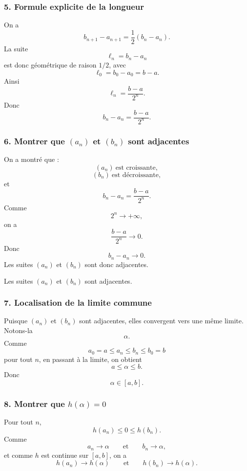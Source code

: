 \documentclass[11pt,a4paper]{article}
\begin{document}
\subsubsection*{5. Formule explicite de la longueur}

On a
\[
b_{n+1}-a_{n+1}=\frac12(b_n-a_n).
\]
La suite
\[
\ell_n=b_n-a_n
\]
est donc géométrique de raison \(1/2\), avec
\[
\ell_0=b_0-a_0=b-a.
\]
Ainsi
\[
\ell_n=\frac{b-a}{2^n}.
\]
Donc
\[
b_n-a_n=\frac{b-a}{2^n}.
\]


\subsubsection*{6. Montrer que \((a_n)\) et \((b_n)\) sont adjacentes}

On a montré que :
\[
(a_n)\ \text{est croissante},
\]
\[
(b_n)\ \text{est décroissante},
\]
et
\[
b_n-a_n=\frac{b-a}{2^n}.
\]
Comme
\[
2^n\to+\infty,
\]
on a
\[
\frac{b-a}{2^n}\to0.
\]
Donc
\[
b_n-a_n\to0.
\]
Les suites \((a_n)\) et \((b_n)\) sont donc adjacentes.

\begin{resultatbox}
Les suites \((a_n)\) et \((b_n)\) sont adjacentes.
\end{resultatbox}


\subsubsection*{7. Localisation de la limite commune}

Puisque \((a_n)\) et \((b_n)\) sont adjacentes, elles convergent vers une même limite. Notons-la
\[
\alpha.
\]
Comme
\[
a_0=a\leq a_n\leq b_n\leq b_0=b
\]
pour tout \(n\), en passant à la limite, on obtient
\[
a\leq\alpha\leq b.
\]
Donc
\[
\alpha\in[a,b].
\]


\subsubsection*{8. Montrer que \(h(\alpha)=0\)}

Pour tout \(n\),
\[
h(a_n)\leq0\leq h(b_n).
\]
Comme
\[
a_n\to\alpha
\qquad\text{et}\qquad
b_n\to\alpha,
\]
et comme \(h\) est continue sur \([a,b]\), on a
\[
h(a_n)\to h(\alpha)
\qquad\text{et}\qquad
h(b_n)\to h(\alpha).
\]
\end{document}
